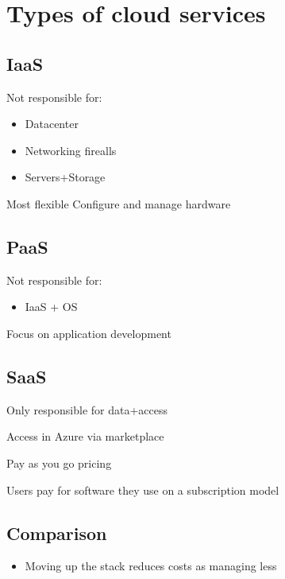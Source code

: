 \documentclass{article}[18pt]
\begin{document}
\hypertarget{types-of-cloud-services}{%
	\section{Types of cloud services}\label{types-of-cloud-services}}

\hypertarget{iaas}{%
	\subsection{IaaS}\label{iaas}}

Not responsible for:

\begin{itemize}
	\tightlist
	\item
	Datacenter
	\item
	Networking firealls
	\item
	Servers+Storage
\end{itemize}

Most flexible Configure and manage hardware

\hypertarget{paas}{%
	\subsection{PaaS}\label{paas}}

Not responsible for:

\begin{itemize}
	\tightlist
	\item
	IaaS + OS
\end{itemize}

Focus on application development

\hypertarget{saas}{%
	\subsection{SaaS}\label{saas}}

Only responsible for data+access

Access in Azure via marketplace

Pay as you go pricing

Users pay for software they use on a subscription model

\hypertarget{comparison}{%
	\subsection{Comparison}\label{comparison}}

\begin{itemize}
	\tightlist
	\item
	Moving up the stack reduces costs as managing less
\end{itemize}
\end{document}
